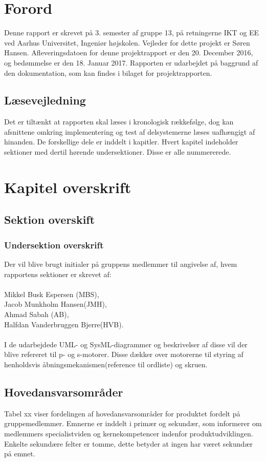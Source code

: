 \chapter{Forord}
Denne rapport er skrevet på 3. semester af gruppe 13, på retningerne IKT og EE ved Aarhus Universitet, Ingeniør højskolen. 
Vejleder for dette projekt er Søren Hansen. Afleveringsdatoen for denne projektrapport er den 20. December 2016, og bedømmelse er den 18. Januar 2017.
Rapporten er udarbejdet på baggrund af den dokumentation, som kan findes i bilaget for projektrapporten.

\section{Læsevejledning}
Det er tiltænkt at rapporten skal læses i kronologisk rækkefølge, dog kan afsnittene omkring implementering og test af delsystemerne læses
uafhængigt af hinanden. De forskellige dele er inddelt i kapitler. Hvert kapitel indeholder sektioner med dertil hørende undersektioner. Disse er alle nummererede.\\

\chapter{Kapitel overskrift}
\section{Sektion overskift}
\subsection{Undersektion overskrift}

\noindent
Der vil blive brugt initialer på gruppens medlemmer til angivelse af, hvem rapportens sektioner er skrevet af: \\
\\
Mikkel Busk Espersen (MBS), \\
Jacob Munkholm Hansen(JMH), \\
Ahmad Sabah (AB), \\
Halfdan Vanderbruggen Bjerre(HVB). \\
\\
I de udarbejdede UML- og SysML-diagrammer og beskrivelser af disse vil der blive refereret til p- og s-motorer. Disse dækker over motorerne til styring af 
henholdsvis åbningsmekanismen(reference til ordliste) og skruen.

\section{Hovedansvarsområder}
Tabel xx viser fordelingen af hovedansvarsområder for produktet fordelt på gruppemedlemmer. Emnerne er inddelt i primær og sekundær, som informerer om 
medlemmers specialistviden og kernekompetencer indenfor produktudviklingen. Enkelte sekundære felter er tomme, dette betyder at ingen har været sekundær på 
emnet.\\

